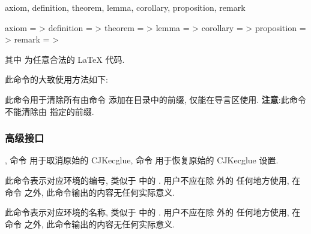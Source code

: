 \begin{keyval}[parent=..]{axiom, definition, theorem, lemma, corollary, proposition, remark}
  \begin{syntax}
    axiom       = >
    definition  = >
    theorem     = >
    lemma       = >
    corollary   = >
    proposition = >
    remark      = >
  \end{syntax}
  其中  为任意合法的 \LaTeX{} 代码.
\end{keyval}
此命令的大致使用方法如下:
\begin{DocExample}
\end{DocExample}


\begin{function}[updated=2025-04-25]{\zthmtocsymrm}
  此命令用于清除所有由命令 \cmd{\zthmtocsym} 添加在目录中的前缀, 仅能在导言区使用. 
  \textbf{注意}:此命令不能清除由 \cmd{\zthmtocprefix} 指定的前缀.
\end{function}



\clearpage
\subsubsection{高级接口}
\begin{function}[added=2025-09-03]{\zthmremoveCJKecglue, \zthmrestoreCJKecglue}
  命令 \cmd{\zthmremoveCJKecglue} 用于取消原始的 CJKecglue,
  命令 \cmd{\zthmrestoreCJKecglue} 用于恢复原始的 CJKecglue 设置.
\end{function}

\begin{function}[EXP, updated=2024-11-05]{\zthmnumber}
  此命令表示对应环境的编号, 类似于  中的 \cmd{\thmnumber}. 用户不应在除 \cmd{\zthmtitleformat} 外的
  任何地方使用, 在命令  之外, 此命令输出的内容无任何实际意义.
\end{function}

\begin{function}[EXP, updated=2024-11-05]{\zthmname}
  此命令表示对应环境的名称, 类似于  中的 \cmd{\thmname}. 用户不应在除 \cmd{\zthmtitleformat} 外的
  任何地方使用, 在命令  之外, 此命令输出的内容无任何实际意义.
\end{function}

